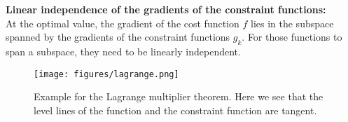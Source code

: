 \documentclass[12pt,a4paper]{article}
\begin{document}
\textbf{Linear independence of the gradients of the constraint functions:}\\
At the optimal value, the gradient of the cost function $f$ lies in the subspace spanned by the gradients of the constraint functions $g_k$. For those functions to span a subspace, they need to be linearly independent.

\begin{figure}
    \centering
    \texttt{[image: figures/lagrange.png]}
    \caption{Example for the Lagrange multiplier theorem. Here we see that the level lines of the function and the constraint function are tangent.}
    \label{fig:lagrange}
\end{figure}

\end{document}
